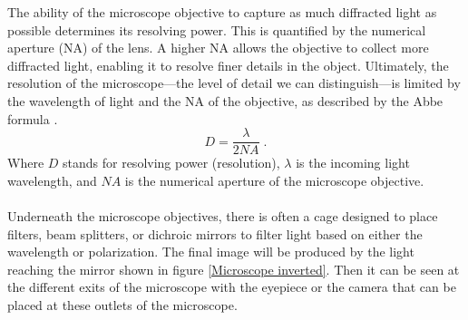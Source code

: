 \documentclass[letterpaper,12pt,oneside]{book}
\begin{document}
The ability of the microscope objective to capture as much diffracted light as possible determines its resolving power. This is quantified by the numerical aperture (NA) of the lens. A higher NA allows the objective to collect more diffracted light, enabling it to resolve finer details in the object. Ultimately, the resolution of the microscope—the level of detail we can distinguish—is limited by the wavelength of light and the NA of the objective, as described by the Abbe formula \cite{lin1986lost}.
\begin{equation}
    D=\frac{\lambda}{2 NA} \; .
\end{equation}
Where $D$ stands for resolving power (resolution), $\lambda$ is the incoming light wavelength, and $NA$ is the numerical aperture of the microscope objective. 
\\\\ %
Underneath the microscope objectives, there is often a cage designed to place filters, beam splitters, or dichroic mirrors to filter light based on either the wavelength or polarization. The final image will be produced by the light reaching the mirror shown in figure \ref{Microscope inverted}. Then it can be seen at the different exits of the microscope with the eyepiece or the camera that can be placed at these outlets of the microscope.


\noindent
\end{document}
